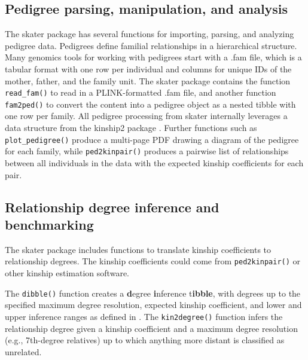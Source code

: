 \documentclass{bioinfo}
\begin{document}
\subsection{Pedigree parsing, manipulation, and analysis}

The skater package has several functions for importing, parsing, and
analyzing pedigree data. Pedigrees define familial relationships in a
hierarchical structure. Many genomics tools for working with pedigrees
start with a .fam file, which is a tabular format with one row per
individual and columns for unique IDs of the mother, father, and the
family unit. The skater package contains the function
\texttt{read\_fam()} to read in a PLINK-formatted .fam file, and another
function \texttt{fam2ped()} to convert the content into a pedigree
object as a nested tibble with one row per family. All pedigree
processing from skater internally leverages a data structure from the
kinship2 package \citep{kinship2}. Further functions such as
\texttt{plot\_pedigree()} produce a multi-page PDF drawing a diagram of
the pedigree for each family, while \texttt{ped2kinpair()} produces a
pairwise list of relationships between all individuals in the data with
the expected kinship coefficients for each pair.

\subsection{Relationship degree inference and benchmarking}

The skater package includes functions to translate kinship coefficients
to relationship degrees. The kinship coefficients could come from
\texttt{ped2kinpair()} or other kinship estimation software.

The \texttt{dibble()} function creates a \textbf{d}egree
\textbf{i}nference t\textbf{ibble}, with degrees up to the specified
maximum degree resolution, expected kinship coefficient, and lower and
upper inference ranges as defined in \citet{manichaikul2010}. The
\texttt{kin2degree()} function infers the relationship degree given a
kinship coefficient and a maximum degree resolution (e.g., 7th-degree
relatives) up to which anything more distant is classified as unrelated.
\end{document}
